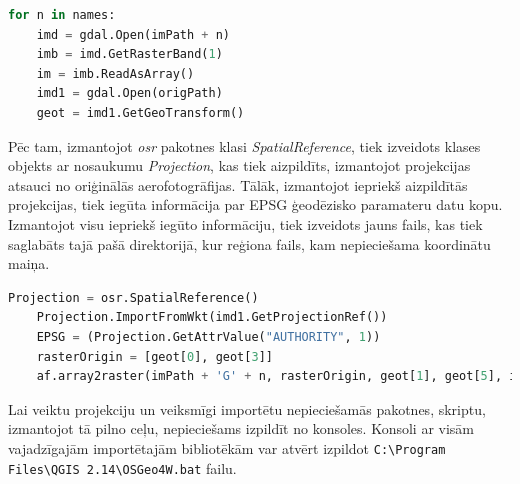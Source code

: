 \documentclass[12pt,paper=a4]{report}
\begin{document}
\begin{lstlisting}[language=Python]
for n in names:
    imd = gdal.Open(imPath + n)
    imb = imd.GetRasterBand(1)
    im = imb.ReadAsArray()
    imd1 = gdal.Open(origPath)
    geot = imd1.GetGeoTransform()
\end{lstlisting}\par
Pēc tam, izmantojot \textit{osr} pakotnes klasi \textit{SpatialReference}, tiek izveidots klases objekts ar nosaukumu \textit{Projection}, kas tiek aizpildīts, izmantojot projekcijas atsauci no oriģinālās aerofotogrāfijas. Tālāk, izmantojot iepriekš aizpildītās projekcijas, tiek iegūta informācija par EPSG ģeodēzisko paramateru datu kopu. Izmantojot visu iepriekš iegūto informāciju, tiek izveidots jauns fails, kas tiek saglabāts tajā pašā direktorijā, kur reģiona fails, kam nepieciešama koordinātu maiņa.
\begin{lstlisting}[language=Python]
	Projection = osr.SpatialReference()
    Projection.ImportFromWkt(imd1.GetProjectionRef())
    EPSG = (Projection.GetAttrValue("AUTHORITY", 1))
    rasterOrigin = [geot[0], geot[3]]
    af.array2raster(imPath + 'G' + n, rasterOrigin, geot[1], geot[5], im, 1, gdal.GDT_UInt16, 3059)
\end{lstlisting}\par
Lai veiktu projekciju un veiksmīgi importētu nepieciešamās pakotnes, skriptu, izmantojot tā pilno ceļu, nepieciešams izpildīt no konsoles. Konsoli ar visām vajadzīgajām importētajām bibliotēkām var atvērt izpildot \verb|C:\Program Files\QGIS 2.14\OSGeo4W.bat| failu.
\end{document}
